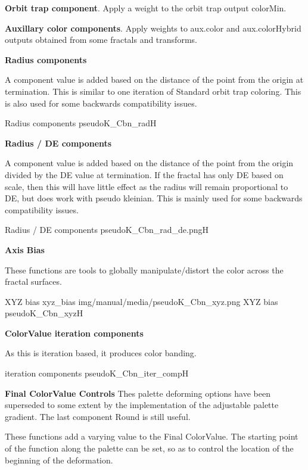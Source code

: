 \textbf{Orbit trap component}. Apply a weight to the orbit trap output colorMin.

\textbf{Auxillary color components}. Apply weights to aux.color and aux.colorHybrid outputs obtained from some fractals and transforms.

\textbf{Radius components} 

A component value is added based on the distance of the point from the origin at termination.
This is similar to one iteration of Standard orbit trap coloring. This is also used for some backwards compatibility issues.

{Radius components}
{pseudoK_Cbn_rad}{H}

\textbf{Radius / DE components}

A component value is added based on the distance of the point from the origin divided by the DE value at termination. If the fractal has only DE based on scale, then this will have little effect as the radius will remain proportional to DE, but does work with pseudo kleinian. This is mainly used for some backwards compatibility issues.

{Radius / DE components}
{pseudoK_Cbn_rad_de.png}{H}

\textbf{Axis Bias}

These functions are tools to globally manipulate/distort the color across the fractal surfaces.
 
{XYZ bias}
{xyz_bias}
{img/manual/media/pseudoK_Cbn_xyz.png}
{XYZ bias}
{pseudoK_Cbn_xyz}{H}

\textbf{ColorValue iteration components}

As this is iteration based, it produces color banding.

{iteration components}
{pseudoK_Cbn_iter_comp}{H}

\textbf{Final ColorValue Controls}
Thes palette deforming options have been superseded to some extent by the implementation of the adjustable palette gradient. The last component Round is still useful.

These functions add a varying value to the Final ColorValue. The starting point of the function along the palette can be set, so as to control the location of the beginning of the deformation.

